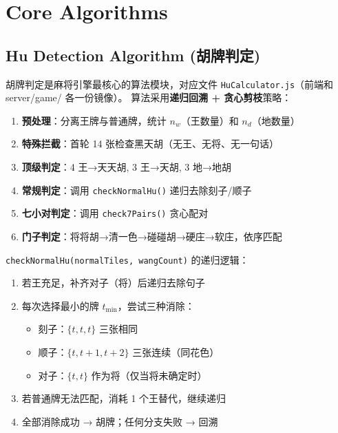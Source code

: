 \documentclass[11pt,a4paper]{article}
\begin{document}
\section{Core Algorithms}

\subsection{Hu Detection Algorithm (胡牌判定)}

胡牌判定是麻将引擎最核心的算法模块，对应文件 \texttt{HuCalculator.js}（前端和 server/game/ 各一份镜像）。
算法采用\textbf{递归回溯 + 贪心剪枝}策略：

\begin{enumerate}[nosep]
  \item \textbf{预处理}：分离王牌与普通牌，统计 $n_w$（王数量）和 $n_d$（地数量）
  \item \textbf{特殊拦截}：首轮 14 张检查黑天胡（无王、无将、无一句话）
  \item \textbf{顶级判定}：4 王→天天胡, 3 王→天胡, 3 地→地胡
  \item \textbf{常规判定}：调用 \texttt{checkNormalHu()} 递归去除刻子/顺子
  \item \textbf{七小对判定}：调用 \texttt{check7Pairs()} 贪心配对
  \item \textbf{门子判定}：将将胡→清一色→碰碰胡→硬庄→软庄，依序匹配
\end{enumerate}

\texttt{checkNormalHu(normalTiles, wangCount)} 的递归逻辑：
\begin{enumerate}[nosep]
  \item 若王充足，补齐对子（将）后递归去除句子
  \item 每次选择最小的牌 $t_{\min}$，尝试三种消除：
    \begin{itemize}[nosep]
      \item 刻子：$\{t,t,t\}$ 三张相同
      \item 顺子：$\{t,t+1,t+2\}$ 三张连续（同花色）
      \item 对子：$\{t,t\}$ 作为将（仅当将未确定时）
    \end{itemize}
  \item 若普通牌无法匹配，消耗 1 个王替代，继续递归
  \item 全部消除成功 → 胡牌；任何分支失败 → 回溯
\end{enumerate}
\end{document}
